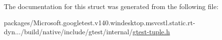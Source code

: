 The documentation for this struct was generated from the following file\+:\begin{DoxyCompactItemize}
\item 
packages/\+Microsoft.\+googletest.\+v140.\+windesktop.\+msvcstl.\+static.\+rt-\/dyn.../build/native/include/gtest/internal/\mbox{\hyperlink{gtest-tuple_8h}{gtest-\/tuple.\+h}}\end{DoxyCompactItemize}
